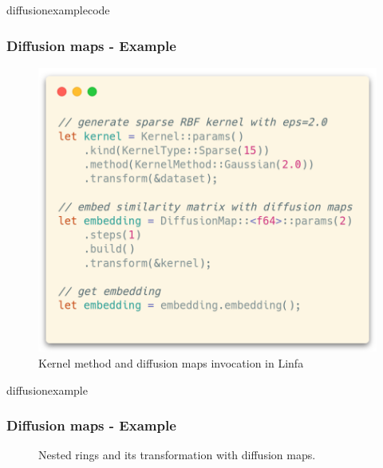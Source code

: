 \documentclass[xcolor=x11names,compress]{beamer}
\begin{document}
\begin{frame}{diffusionexamplecode}
    \frametitle{Diffusion maps - Example}

    \begin{figure}[ht]
        \centering
        \includegraphics[width=0.5\linewidth]{images/diffusion_code.png}
        \caption{Kernel method and diffusion maps invocation in Linfa}%
    \end{figure}
\end{frame}

\begin{frame}{diffusionexample}
    \frametitle{Diffusion maps - Example}

    \begin{figure}[ht]
        \centering
        \subfloat[Original]{\resizebox{0.45\linewidth}{!}{}}
        \subfloat[Embedded]{\resizebox{0.45\linewidth}{!}{}}
        \caption{Nested rings and its transformation with diffusion maps.}%
    \end{figure}
\end{frame}
\end{document}
